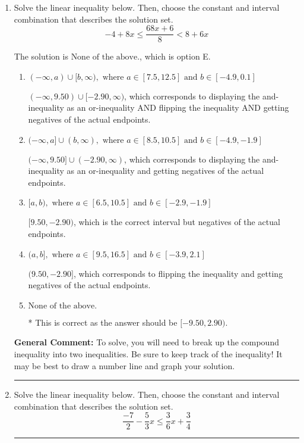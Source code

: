 \documentclass{extbook}[14pt]
\newcommand{\litem}[1]{\item #1

\rule{\textwidth}{0.4pt}}
\begin{document}
\begin{enumerate}
{\begin{enumerate}[label=\Alph*.]
You may have chosen this if you thought the inequality did not match the ends of the intervals.
\end{enumerate}

\textbf{General Comment:} Remember that less/greater than or equal to includes the endpoint, while less/greater do not. Also, remember that you need to flip the inequality when you multiply or divide by a negative.
}
\litem{
Solve the linear inequality below. Then, choose the constant and interval combination that describes the solution set.
\[ -4 + 8 x \leq \frac{68 x + 6}{8} < 8 + 6 x \]

The solution is \( \text{None of the above.} \), which is option E.\begin{enumerate}[label=\Alph*.]
\item \( (-\infty, a) \cup [b, \infty), \text{ where } a \in [7.5, 12.5] \text{ and } b \in [-4.9, 0.1] \)

$(-\infty, 9.50) \cup [-2.90, \infty)$, which corresponds to displaying the and-inequality as an or-inequality AND flipping the inequality AND getting negatives of the actual endpoints.
\item \( (-\infty, a] \cup (b, \infty), \text{ where } a \in [8.5, 10.5] \text{ and } b \in [-4.9, -1.9] \)

$(-\infty, 9.50] \cup (-2.90, \infty)$, which corresponds to displaying the and-inequality as an or-inequality and getting negatives of the actual endpoints.
\item \( [a, b), \text{ where } a \in [6.5, 10.5] \text{ and } b \in [-2.9, -1.9] \)

$[9.50, -2.90)$, which is the correct interval but negatives of the actual endpoints.
\item \( (a, b], \text{ where } a \in [9.5, 16.5] \text{ and } b \in [-3.9, 2.1] \)

$(9.50, -2.90]$, which corresponds to flipping the inequality and getting negatives of the actual endpoints.
\item \( \text{None of the above.} \)

* This is correct as the answer should be $[-9.50, 2.90)$.
\end{enumerate}

\textbf{General Comment:} To solve, you will need to break up the compound inequality into two inequalities. Be sure to keep track of the inequality! It may be best to draw a number line and graph your solution.
}
\litem{
Solve the linear inequality below. Then, choose the constant and interval combination that describes the solution set.
\[ \frac{-7}{2} - \frac{5}{3} x \leq \frac{3}{6} x + \frac{3}{4} \]

}
\end{enumerate}
\end{document}
